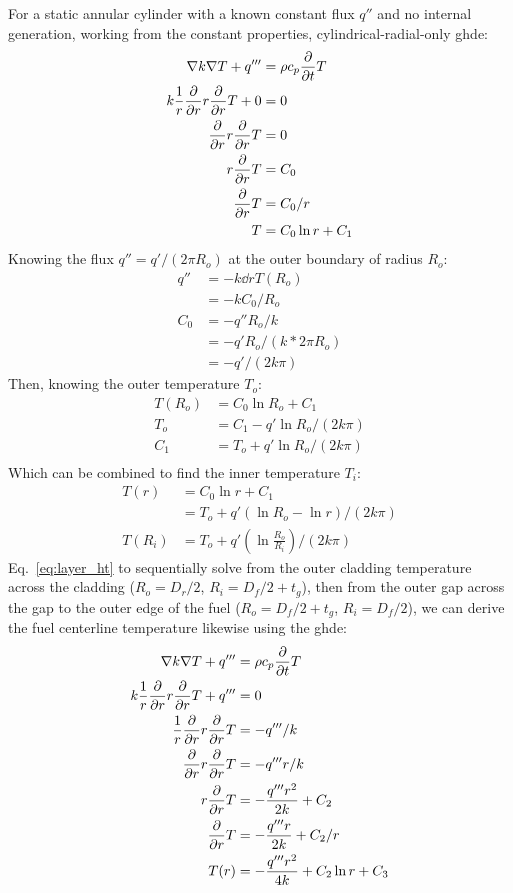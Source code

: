 \documentclass[12pt]{article}
\begin{document}
For a static annular cylinder with a known constant flux $q''$ and no internal generation, working from the constant properties, cylindrical-radial-only \gls{ghde}:
\newcommand{\ddr}{\dd{r}}
\begin{align}
    \nabla k\nabla T + q''' &= \rho c_p\ddt T\\
        k\frac{1}{r}\ddr r\ddr T + 0 &= 0\\
    \ddr r\ddr T &= 0\\
    r\ddr T &= C_0 \\
    \ddr T &= C_0/r \\
    T &= C_0\ln{r} + C_1
\end{align}
Knowing the flux $q''=q'/(2\pi R_o)$ at the outer boundary of radius $R_o$:
\begin{align}
    q'' &= -k\ddr T(R_o)\\
    &=-k C_0/R_o\\
    C_0 &= -q''R_o/k\\
    &= -q'R_o/(k * 2\pi R_o)\\
    &= -q'/(2k\pi)
\end{align}
Then, knowing the outer temperature $T_o$:
\begin{align}
    T(R_o)&=C_0\ln{R_o} + C_1\\
    T_o&= C_1 - q'\ln{R_o}/(2k\pi)\\
    C_1&= T_o + q'\ln{R_o}/(2k\pi)\\
\end{align}
Which can be combined to find the inner temperature $T_i$:
\begin{align}
    T(r) &= C_0\ln{r} + C_1\\
    &= T_o + q'(\ln{R_o}-\ln{r})/(2k\pi)\\
    \label{eq:layer_ht}
    T(R_i)&= T_o + q'(\ln{\frac{R_o}{R_i}})/(2k\pi)
\end{align}
Eq.~\ref{eq:layer_ht} to sequentially solve from the outer cladding temperature across the cladding ($R_o=D_r/2$, $R_i=D_f/2 + t_g$), then from the outer gap across the gap to the outer edge of the fuel ($R_o=D_f/2+t_g$, $R_i=D_f/2$), we can derive the fuel centerline temperature likewise using the \gls{ghde}:
\begin{align}
    \nabla k\nabla T + q''' &= \rho c_p\ddt T\\
        k\frac{1}{r}\ddr r\ddr T + q''' &= 0\\
        \frac{1}{r}\ddr r\ddr T &= -q'''/k\\
        \ddr r\ddr T &= -q'''r/k\\
        r\ddr T &= -\frac{q'''r^2}{2k} + C_2 \\
        \ddr T &= -\frac{q'''r}{2k} + C_2/r \\
        T(r) &= -\frac{q'''r^2}{4k} + C_2\ln{r} + C_3
\end{align}
\end{document}
